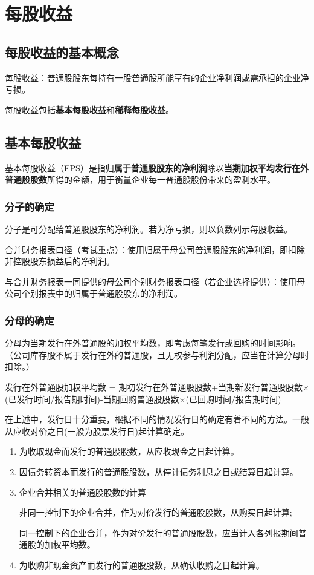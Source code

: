 \documentclass[UTF8,12pt]{ctexart}
\numberwithin{equation}{section} %
\numberwithin{figure}{section}
\numberwithin{table}{section}
\begin{document}
	\newpage
	
	\section{每股收益}
	\subsection{每股收益的基本概念}
	每股收益：普通股股东每持有一股普通股所能享有的企业净利润或需承担的企业净亏损。
	
	每股收益包括\textbf{基本每股收益}和\textbf{稀释每股收益}。
	
	\subsection{基本每股收益}
	基本每股收益（EPS）是指归\textbf{属于普通股股东的净利润}除以\textbf{当期加权平均发行在外普通股股数}所得的金额，用于衡量企业每一普通股股份带来的盈利水平。
	\subsubsection{分子的确定}
	
	分子是可分配给普通股股东的净利润。若为净亏损，则以负数列示每股收益。
	
	合并财务报表口径（考试重点）：使用归属于母公司普通股股东的净利润，即扣除非控股股东损益后的净利润。
	
	与合并财务报表一同提供的母公司个别财务报表口径（若企业选择提供）：使用母公司个别报表中的归属于普通股股东的净利润。
	
	
	\subsubsection{分母的确定}
	
	分母为当期发行在外普通股的加权平均数，即考虑每笔发行或回购的时间影响。（公司库存股不属于发行在外的普通股，且无权参与利润分配，应当在计算分母时扣除。）
	
	发行在外普通股加权平均数 = 期初发行在外普通股股数+当期新发行普通股股数$\times$(已发行时间/报告期时间)-当期回购普通股股数$\times$(已回购时间/报告期时间)
	
	在上述中，发行日十分重要，根据不同的情况发行日的确定有着不同的方法。一般从应收对价之日(一般为股票发行日)起计算确定。
	\begin{enumerate}
		\item 为收取现金而发行的普通股股数，从应收现金之日起计算。
		
		\item 因债务转资本而发行的普通股股数，从停计债务利息之日或结算日起计算。
		
		\item 企业合并相关的普通股股数的计算
		
		非同一控制下的企业合并，作为对价发行的普通股股数，从购买日起计算;
		
		同一控制下的企业合并，作为对价发行的普通股股数，应当计入各列报期间普通股的加权平均数。
		
		\item 为收购非现金资产而发行的普通股股数，从确认收购之日起计算。
	\end{enumerate}
\end{document}
